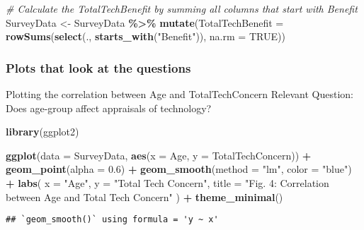 \documentclass[
]{article}
\newenvironment{Shaded}{\begin{snugshade}}{\end{snugshade}}
\newcommand{\AttributeTok}[1]{\textcolor[rgb]{0.13,0.29,0.53}{#1}}
\newcommand{\CommentTok}[1]{\textcolor[rgb]{0.56,0.35,0.01}{\textit{#1}}}
\newcommand{\ConstantTok}[1]{\textcolor[rgb]{0.56,0.35,0.01}{#1}}
\newcommand{\FloatTok}[1]{\textcolor[rgb]{0.00,0.00,0.81}{#1}}
\newcommand{\FunctionTok}[1]{\textcolor[rgb]{0.13,0.29,0.53}{\textbf{#1}}}
\newcommand{\NormalTok}[1]{#1}
\newcommand{\OtherTok}[1]{\textcolor[rgb]{0.56,0.35,0.01}{#1}}
\newcommand{\SpecialCharTok}[1]{\textcolor[rgb]{0.81,0.36,0.00}{\textbf{#1}}}
\newcommand{\StringTok}[1]{\textcolor[rgb]{0.31,0.60,0.02}{#1}}
\begin{document}
\begin{Shaded}
\begin{Highlighting}[]
\CommentTok{\# Calculate the TotalTechBenefit by summing all columns that start with \textquotesingle{}Benefit\textquotesingle{}}
\NormalTok{SurveyData }\OtherTok{\textless{}{-}}\NormalTok{ SurveyData }\SpecialCharTok{\%\textgreater{}\%}
  \FunctionTok{mutate}\NormalTok{(}\AttributeTok{TotalTechBenefit =} \FunctionTok{rowSums}\NormalTok{(}\FunctionTok{select}\NormalTok{(., }\FunctionTok{starts\_with}\NormalTok{(}\StringTok{"Benefit"}\NormalTok{)), }\AttributeTok{na.rm =} \ConstantTok{TRUE}\NormalTok{))}
\end{Highlighting}
\end{Shaded}

\hypertarget{plots-that-look-at-the-questions}{%
\subsubsection{Plots that look at the
questions}\label{plots-that-look-at-the-questions}}

Plotting the correlation between Age and TotalTechConcern Relevant
Question: Does age-group affect appraisals of technology?

\begin{Shaded}
\begin{Highlighting}[]
\FunctionTok{library}\NormalTok{(ggplot2)}

\FunctionTok{ggplot}\NormalTok{(}\AttributeTok{data =}\NormalTok{ SurveyData, }\FunctionTok{aes}\NormalTok{(}\AttributeTok{x =}\NormalTok{ Age, }\AttributeTok{y =}\NormalTok{ TotalTechConcern)) }\SpecialCharTok{+}
  \FunctionTok{geom\_point}\NormalTok{(}\AttributeTok{alpha =} \FloatTok{0.6}\NormalTok{) }\SpecialCharTok{+}
  \FunctionTok{geom\_smooth}\NormalTok{(}\AttributeTok{method =} \StringTok{"lm"}\NormalTok{, }\AttributeTok{color =} \StringTok{"blue"}\NormalTok{) }\SpecialCharTok{+}
  \FunctionTok{labs}\NormalTok{(}
    \AttributeTok{x =} \StringTok{"Age"}\NormalTok{, }\AttributeTok{y =} \StringTok{"Total Tech Concern"}\NormalTok{,}
    \AttributeTok{title =} \StringTok{"Fig. 4: Correlation between Age and Total Tech Concern"}
\NormalTok{  ) }\SpecialCharTok{+}
  \FunctionTok{theme\_minimal}\NormalTok{()}
\end{Highlighting}
\end{Shaded}

\begin{verbatim}
## `geom_smooth()` using formula = 'y ~ x'
\end{verbatim}
\end{document}
